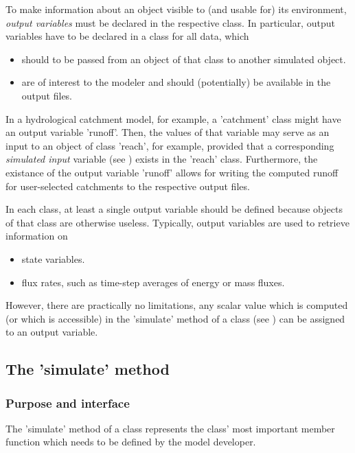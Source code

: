To make information about an object visible to (and usable for) its environment, \emph{output variables} must be declared in the respective class. In particular, output variables have to be declared in a class for all data, which
\begin{itemize}
  \item should to be passed from an object of that class to another simulated object.
  \item are of interest to the modeler and should (potentially) be available in the output files.
\end{itemize}

In a hydrological catchment model, for example, a 'catchment' class might have an output variable 'runoff'. Then, the values of that variable may serve as an input to an object of class 'reach', for example, provided that a corresponding \emph{simulated input} variable (see ) exists in the 'reach' class. Furthermore, the existance of the output variable 'runoff' allows for writing the computed runoff for user-selected catchments to the respective output files.

In each class, at least a single output variable should be defined because objects of that class are otherwise useless. Typically, output variables are used to retrieve information on
\begin{itemize}
  \item state variables.
  \item flux rates, such as time-step averages of energy or mass fluxes.
\end{itemize}
However, there are practically no limitations, \ie{} any scalar value which is computed (or which is accessible) in the 'simulate' method of a class (see ) can be assigned to an output variable.

\subsection{The 'simulate' method} \label{sec:concept-classFeatures-simulateMethod}

\subsubsection*{Purpose and interface}
The 'simulate' method of a class represents the class' most important member function which needs to be defined by the model developer.

